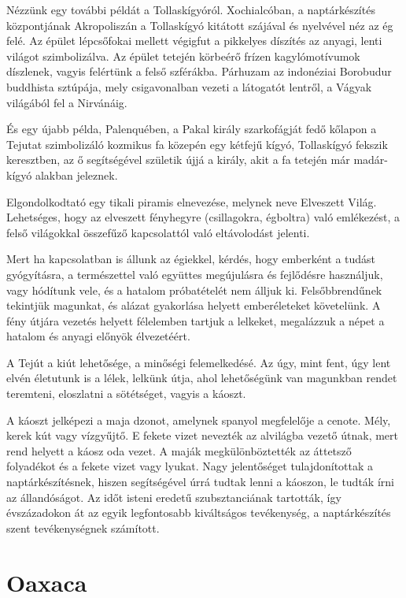 Nézzünk egy további példát a Tollaskígyóról. Xochialcóban, a naptárkészítés
központjának Akropoliszán a Tollaskígyó kitátott szájával
és nyelvével néz az ég felé. Az épület lépcsőfokai mellett végigfut a
pikkelyes díszítés az anyagi, lenti világot szimbolizálva. Az épület tetején
körbeérő frízen kagylómotívumok díszlenek, vagyis felértünk a felső
szférákba. Párhuzam az indonéziai Borobudur buddhista sztúpája,
mely csigavonalban vezeti a látogatót lentről, a Vágyak világából fel a
Nirvánáig.

És egy újabb példa, Palenquében, a Pakal király szarkofágját fedő
kőlapon a Tejutat szimbolizáló kozmikus fa közepén egy kétfejű kígyó,
Tollaskígyó fekszik keresztben, az ő segítségével születik újjá a
király, akit a fa tetején már madár-kígyó alakban jeleznek.

Elgondolkodtató egy tikali piramis elnevezése, melynek neve Elveszett
Világ. Lehetséges, hogy az elveszett fényhegyre (csillagokra, égboltra)
való emlékezést, a felső világokkal összefűző kapcsolattól való
eltávolodást jelenti.

\bigskip
\begin{itshape}
Mert ha kapcsolatban is állunk az égiekkel, kérdés, hogy emberként a
tudást gyógyításra, a természettel való együttes megújulásra és fejlődésre
használjuk, vagy hódítunk vele, és a hatalom próbatételét nem álljuk ki.
Felsőbbrendűnek tekintjük magunkat, és alázat gyakorlása helyett emberéleteket
követelünk. A fény útjára vezetés helyett félelemben tartjuk a lelkeket,
megalázzuk a népet a hatalom és anyagi előnyök élvezetéért.
\end{itshape}
\bigskip

A Tejút a kiút lehetősége, a minőségi felemelkedésé. Az úgy, mint
fent, úgy lent elvén életutunk is a lélek, lelkünk útja, ahol lehetőségünk
van magunkban rendet teremteni, eloszlatni a sötétséget, vagyis
a káoszt.

A káoszt jelképezi a maja dzonot, amelynek spanyol megfelelője a
cenote. Mély, kerek kút vagy vízgyűjtő. E fekete vizet nevezték az
alvilágba vezető útnak, mert rend helyett a káosz oda vezet. A maják
megkülönböztették az áttetsző folyadékot és a fekete vizet vagy lyukat.
Nagy jelentőséget tulajdonítottak a naptárkészítésnek, hiszen segítségével
úrrá tudtak lenni a káoszon, le tudták írni az állandóságot.
Az időt isteni eredetű szubsztanciának tartották, így évszázadokon át
az egyik legfontosabb kiváltságos tevékenység, a naptárkészítés szent
tevékenységnek számított.

\section{Oaxaca}

